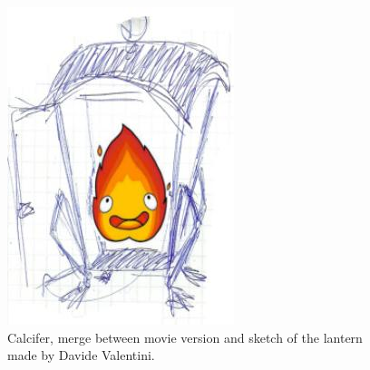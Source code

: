 \hfill\begin{minipage}{0.4\textwidth}
  \begin{figure}[H]
    \includegraphics{Images/Characters/lantern}
    \caption{Calcifer, merge between movie version and sketch of the lantern made by Davide Valentini.}
\end{figure}
\end{minipage}





